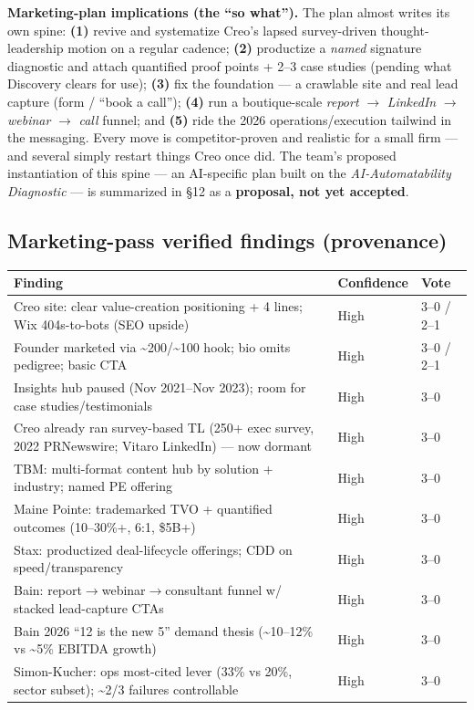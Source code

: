 \documentclass[11pt]{article}
\begin{document}
\begin{takeaway}
\textbf{Marketing-plan implications (the ``so what'').} The plan almost writes its own
spine: \textbf{(1)} revive and systematize Creo's lapsed survey-driven thought-leadership
motion on a regular cadence; \textbf{(2)} productize a \emph{named} signature diagnostic
and attach quantified proof points + 2--3 case studies (pending what Discovery clears for
use); \textbf{(3)} fix the foundation --- a crawlable site and real lead capture (form /
``book a call''); \textbf{(4)} run a boutique-scale \emph{report} $\rightarrow$
\emph{LinkedIn} $\rightarrow$ \emph{webinar} $\rightarrow$ \emph{call} funnel; and
\textbf{(5)} ride the 2026 operations/execution tailwind in the messaging. Every move is
competitor-proven and realistic for a small firm --- and several simply restart things Creo
once did. The team's proposed instantiation of this spine --- an AI-specific plan built on
the \emph{AI-Automatability Diagnostic} --- is summarized in \S12 as a \textbf{proposal,
not yet accepted}.
\end{takeaway}

\subsection*{Marketing-pass verified findings (provenance)}
\begin{center}
\renewcommand{\arraystretch}{1.2}
\small
\begin{longtable}{p{9.2cm} p{1.6cm} p{1.4cm}}
\toprule
\textbf{Finding} & \textbf{Confidence} & \textbf{Vote} \\
\midrule
\endhead
Creo site: clear value-creation positioning + 4 lines; Wix 404s-to-bots (SEO upside) & High & 3--0 / 2--1 \\
Founder marketed via \textasciitilde{}200/\textasciitilde{}100 hook; bio omits pedigree; basic CTA & High & 3--0 / 2--1 \\
Insights hub paused (Nov 2021--Nov 2023); room for case studies/testimonials & High & 3--0 \\
Creo already ran survey-based TL (250+ exec survey, 2022 PRNewswire; Vitaro LinkedIn) --- now dormant & High & 3--0 \\
TBM: multi-format content hub by solution + industry; named PE offering & High & 3--0 \\
Maine Pointe: trademarked TVO\texttrademark{} + quantified outcomes (10--30\%+, 6:1, \$5B+) & High & 3--0 \\
Stax: productized deal-lifecycle offerings; CDD on speed/transparency & High & 3--0 \\
Bain: report$\rightarrow$webinar$\rightarrow$consultant funnel w/ stacked lead-capture CTAs & High & 3--0 \\
Bain 2026 ``12 is the new 5'' demand thesis (\textasciitilde{}10--12\% vs \textasciitilde{}5\% EBITDA growth) & High & 3--0 \\
Simon-Kucher: ops most-cited lever (33\% vs 20\%, sector subset); \textasciitilde{}2/3 failures controllable & High & 3--0 \\
\bottomrule
\end{longtable}
\end{center}
\end{document}
